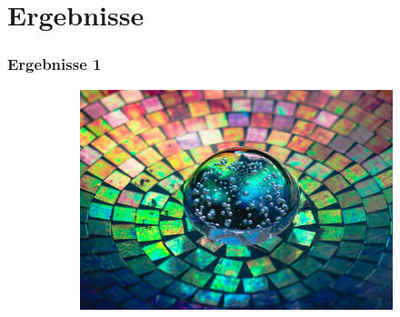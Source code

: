 \section{Ergebnisse}


\begin{frame}
    \frametitle{Ergebnisse 1}

    \begin{figure}[H]
        \centering
    
        \begin{subfigure}[h]{0.32\textwidth}
            \centering
            \quad
        \end{subfigure}
        \begin{subfigure}[h]{0.32\textwidth}
            \centering
            \includegraphics[width=\textwidth]{resources/content/style/crystal_glass_on_a_colorful_background.jpg}
        \end{subfigure}
        \begin{subfigure}[h]{0.32\textwidth}
            \centering

\end{subfigure}
\end{figure}
\end{frame}
